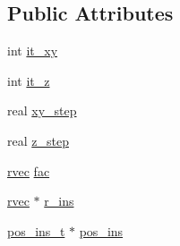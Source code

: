 \subsection*{\-Public \-Attributes}
\begin{DoxyCompactItemize}
\item 
int \hyperlink{structmembed_aa5099ca07e417297ec3aa3d68a998da2}{it\-\_\-xy}
\item 
int \hyperlink{structmembed_aedf1e94b250e6843887106c0f6cf6a99}{it\-\_\-z}
\item 
real \hyperlink{structmembed_a02aaf614c85b3fca2bb52ae4d3ae5738}{xy\-\_\-step}
\item 
real \hyperlink{structmembed_a72482183740a02a120595695f905ee9c}{z\-\_\-step}
\item 
\hyperlink{share_2template_2gromacs_2types_2simple_8h_aa02a552a4abd2f180c282a083dc3a999}{rvec} \hyperlink{structmembed_a16587fafef1debdd3d4879c10128b7a5}{fac}
\item 
\hyperlink{share_2template_2gromacs_2types_2simple_8h_aa02a552a4abd2f180c282a083dc3a999}{rvec} $\ast$ \hyperlink{structmembed_ad34a45ba96abbe44013dabe086a2f6ab}{r\-\_\-ins}
\item 
\hyperlink{structpos__ins__t}{pos\-\_\-ins\-\_\-t} $\ast$ \hyperlink{structmembed_a25ce07ed6f469fcc937f8c331671ca99}{pos\-\_\-ins}
\end{DoxyCompactItemize}



